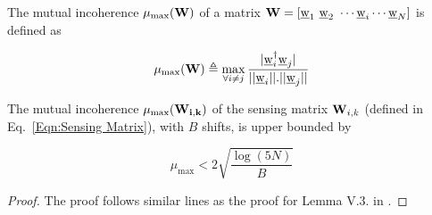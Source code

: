 \begin{definition}
	The mutual incoherence $\mu_{\text{max}}( \mathbf{W})$ of a matrix $\mathbf{W} = [\underline{\mathrm{w}}_1 ~ \underline{\mathrm{w}}_2 ~ \cdots \underline{\mathrm{w}}_i \cdots \underline{\mathrm{w}}_N ]$ is defined as 
	
	\[\mu_{\text{max}}(\mathbf{W}) \triangleq \max \limits_{\forall i \neq j} \frac{|\underline{\mathrm{w}}_i^{\dagger} \underline{\mathrm{w}}_j |}{||\underline{\mathrm{w}}_i || . ||\underline{\mathrm{w}}_j ||} \]
	
\end{definition}
\begin{lemma} \label{lemma:MutualCoherence}
	The mutual incoherence $\mu_{\text{max}} (\mathbf{W_{i,k}})$ of the sensing matrix $\mathbf{W}_{i,k}$ (defined in Eq.~\ref{Eqn:Sensing Matrix}), with $B$ shifts, is upper bounded by
	
	\[ \mu_{\text{max}} < 2\sqrt{\frac{\log(5N)}{B}} \] 
	
\end{lemma}
\begin{proof}
	The proof follows similar lines as the proof for Lemma V.3. in \cite{pawar2014robust}.
\end{proof}
 
